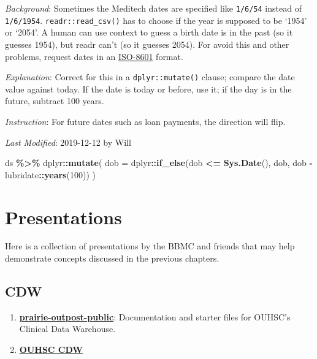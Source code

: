\documentclass[
]{book}
\newenvironment{Shaded}{\begin{snugshade}}{\end{snugshade}}
\newcommand{\DataTypeTok}[1]{\textcolor[rgb]{0.13,0.29,0.53}{#1}}
\newcommand{\DecValTok}[1]{\textcolor[rgb]{0.00,0.00,0.81}{#1}}
\newcommand{\KeywordTok}[1]{\textcolor[rgb]{0.13,0.29,0.53}{\textbf{#1}}}
\newcommand{\NormalTok}[1]{#1}
\newcommand{\OperatorTok}[1]{\textcolor[rgb]{0.81,0.36,0.00}{\textbf{#1}}}
\newcommand{\StringTok}[1]{\textcolor[rgb]{0.31,0.60,0.02}{#1}}
\providecommand{\tightlist}{%
  \setlength{\itemsep}{0pt}\setlength{\parskip}{0pt}}
\begin{document}
\emph{Background}: Sometimes the Meditech dates are specified like \texttt{1/6/54} instead of \texttt{1/6/1954}. \texttt{readr::read\_csv()} has to choose if the year is supposed to be `1954' or `2054'. A human can use context to guess a birth date is in the past (so it guesses 1954), but readr can't (so it guesses 2054). For avoid this and other problems, request dates in an \href{https://www.explainxkcd.com/wiki/index.php/1179:_ISO_8601}{ISO-8601} format.

\emph{Explanation}: Correct for this in a \texttt{dplyr::mutate()} clause; compare the date value against today. If the date is today or before, use it; if the day is in the future, subtract 100 years.

\emph{Instruction}: For future dates such as loan payments, the direction will flip.

\emph{Last Modified}: 2019-12-12 by Will

\begin{Shaded}
\begin{Highlighting}[]
\NormalTok{ ds }\OperatorTok{\%>\%}
\StringTok{ }\NormalTok{dplyr}\OperatorTok{::}\KeywordTok{mutate}\NormalTok{(}
    \DataTypeTok{dob   =}\NormalTok{ dplyr}\OperatorTok{::}\KeywordTok{if\_else}\NormalTok{(dob }\OperatorTok{<=}\StringTok{ }\KeywordTok{Sys.Date}\NormalTok{(), dob, dob }\OperatorTok{{-}}\StringTok{ }\NormalTok{lubridate}\OperatorTok{::}\KeywordTok{years}\NormalTok{(}\DecValTok{100}\NormalTok{))}
\NormalTok{  )}
\end{Highlighting}
\end{Shaded}

\hypertarget{presentations}{%
\chapter{Presentations}\label{presentations}}

Here is a collection of presentations by the BBMC and friends that may help demonstrate concepts discussed in the previous chapters.

\hypertarget{cdw}{%
\section{CDW}\label{cdw}}

\begin{enumerate}
\def\labelenumi{\arabic{enumi}.}
\tightlist
\item
  \textbf{\href{https://github.com/OuhscBbmc/prairie-outpost-public}{prairie-outpost-public}}: Documentation and starter files for OUHSC's Clinical Data Warehouse.
\item
  \textbf{\href{https://github.com/OuhscBbmc/BbmcResources/blob/master/Publications/presentation-2015-11-18-cdw-bse/clinical-data-warehouse-bse.pdf}{OUHSC CDW}}
\end{enumerate}
\end{document}
